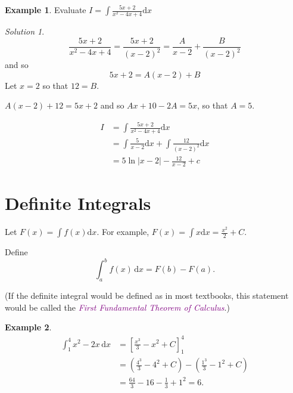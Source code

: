 \documentclass[
  english,
  11pt,
  oneside]{book}
\newcommand{\slide}{}
\theoremstyle{definition}
\theoremstyle{definition}
\newtheorem{example}{Example}[chapter]
\theoremstyle{definition}
\theoremstyle{definition}
\theoremstyle{remark}
\newtheorem*{solution}{Solution}
\begin{document}
\begin{slidesonly}

\slide
\phantom{a}

\end{slidesonly}

\slide

\begin{example}
Evaluate \(I = \displaystyle\int\frac{5x+2}{x^2-4x+4} \mathrm{d}x\)
\end{example}

\begin{solution}
\[
\frac{5x+2}{x^2-4x+4} = \frac{5x+2}{(x-2)^2} = \frac A{x-2}+\frac{B}{(x-2)^2}
\]
and so
\[
5x+2 = A(x-2)+B
\]
Let \(x=2\) so that \(12=B\).

\(A(x-2)+12 = 5x+2\) and so \(Ax+10-2A=5x\), so that \(A=5\).

\begin{align*}
I&= \int\frac{5x+2}{x^2-4x+4} \mathrm{d}x\\
&=\int\frac5{x-2}\mathrm{d}x+\int\frac{12}{(x-2)^2}\mathrm{d}x\\
&=5\ln|x-2|-\frac{12}{x-2}+c
\end{align*}
\end{solution}

\begin{slidesonly}

\slide
\phantom{a}

\end{slidesonly}

\slide

\section{Definite Integrals}\label{definite-integrals}

Let \(F(x) = \displaystyle\int f(x)\mathrm{d}x\). For example, \(F(x)=\displaystyle\int x\mathrm{d}x = \frac{x^2}{2} + C\).

Define
\[
\int_a^b f(x)\,\mathrm{d}x = F(b)-F(a).
\]

(If the definite integral would be defined as in most textbooks, this statement would be called the \textcolor{purple}{\em First Fundamental Theorem of Calculus}.)

\begin{notslides}

\begin{example}
\begin{align*}
\int_1^4 x^2-2x\,\mathrm{d}x& = \left[\frac{x^3}{3}-x^2+C\right]_1^4\\
&=\left(\frac{4^3}{3}-4^2+C\right) - \left(\frac{1^3}{3}-1^2+C\right)\\
&=\frac{64}{3}-16-\frac{1}{3}+1^2 = 6.
\end{align*}
\end{example}

\end{notslides}
\end{document}
